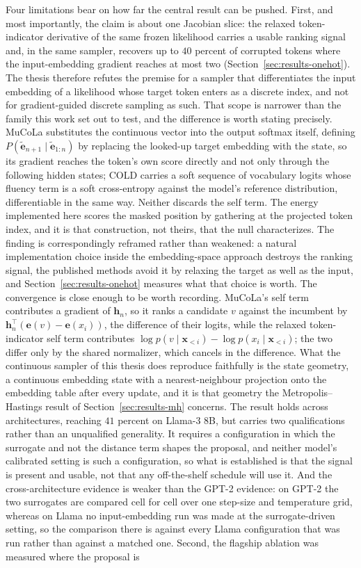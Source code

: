 Four limitations bear on how far the central result can be pushed. First, and most importantly, the claim is about one Jacobian slice: the relaxed token-indicator derivative of the same frozen likelihood carries a usable ranking signal and, in the same sampler, recovers up to $40$ percent of corrupted tokens where the input-embedding gradient reaches at most two (Section~\ref{sec:results-onehot}). The thesis therefore refutes the premise for a sampler that differentiates the input embedding of a likelihood whose target token enters as a discrete index, and not for gradient-guided discrete sampling as such. That scope is narrower than the family this work set out to test, and the difference is worth stating precisely. MuCoLa \citep{kumar2022gradient} substitutes the continuous vector into the output softmax itself, defining $P(\tilde{\bm{e}}_{n+1} \mid \tilde{\bm{e}}_{1:n})$ by replacing the looked-up target embedding with the state, so its gradient reaches the token's own score directly and not only through the following hidden states; COLD \citep{qin2022cold} carries a soft sequence of vocabulary logits whose fluency term is a soft cross-entropy against the model's reference distribution, differentiable in the same way. Neither discards the self term. The energy implemented here scores the masked position by gathering at the projected token index, and it is that construction, not theirs, that the null characterizes. The finding is correspondingly reframed rather than weakened: a natural implementation choice inside the embedding-space approach destroys the ranking signal, the published methods avoid it by relaxing the target as well as the input, and Section~\ref{sec:results-onehot} measures what that choice is worth. The convergence is close enough to be worth recording. MuCoLa's self term contributes a gradient of $\bm{h}_n$, so it ranks a candidate $v$ against the incumbent by $\bm{h}_n^\top(\bm{e}(v) - \bm{e}(x_i))$, the difference of their logits, while the relaxed token-indicator self term contributes $\log p(v \mid \bm{x}_{<i}) - \log p(x_i \mid \bm{x}_{<i})$; the two differ only by the shared normalizer, which cancels in the difference. What the continuous sampler of this thesis does reproduce faithfully is the state geometry, a continuous embedding state with a nearest-neighbour projection onto the embedding table after every update, and it is that geometry the Metropolis--Hastings result of Section~\ref{sec:results-mh} concerns. The result holds across architectures, reaching $41$ percent on Llama-3 8B, but carries two qualifications rather than an unqualified generality. It requires a configuration in which the surrogate and not the distance term shapes the proposal, and neither model's calibrated setting is such a configuration, so what is established is that the signal is present and usable, not that any off-the-shelf schedule will use it. And the cross-architecture evidence is weaker than the GPT-2 evidence: on GPT-2 the two surrogates are compared cell for cell over one step-size and temperature grid, whereas on Llama no input-embedding run was made at the surrogate-driven setting, so the comparison there is against every Llama configuration that was run rather than against a matched one. Second, the flagship ablation was measured where the proposal is 